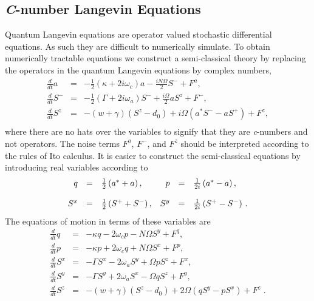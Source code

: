 \documentclass[aps,
twocolumn,
showpacs,
superscriptaddress,groupedaddress]{revtex4}
\begin{document}
\subsection{{\it C}-number Langevin Equations}

Quantum Langevin equations are operator valued stochastic differential
equations.  As such they are difficult to numerically simulate. To
obtain numerically tractable equations we construct a semi-classical
theory by replacing the operators in the quantum Langevin equations by
complex numbers,
\begin{eqnarray}
\frac{d}{dt} a&=& -\frac{1}{2}  (\kappa +2i\omega_c) a
-\frac{i N \Omega}{2} S^{-}
+F^{a},
\label{Lac}\\
\frac{d}{dt} S^{-} &=& -\frac{1}{2}  \left(\Gamma +2 i \omega_a \right)  S^{-}
+\frac{i \Omega}{2} a S^{z}
+F^{-},\\
\frac{d}{dt} S^{z} &=& -(w+\gamma)\left( S^{z} - d_0\right)
+i\Omega \left( a^{*}S^{-} - a S^{+} \right)
+F^{z},\nonumber\\
\label{Lszc}
\end{eqnarray}
where there are no hats over the variables to signify that they are
{\it c}-numbers and not operators.  The noise terms $F^a$, $F^-$, and
$F^z$ should be interpreted according to the rules of Ito calculus. It is easier to construct the semi-classical equations by introducing
real variables according to
\begin{equation}
\begin{array}[b]{rclrcl}
q &=&
\frac{1}{2} \left( a^{*} + a \right),&
p &=&
\frac{1}{2i} \left( a^{*} - a \right),
\\[1pc]
S^x &=&
\frac{1}{2} \left( S^{+} + S^{-} \right),&
S^y &=&
\frac{1}{2i} \left( S^{+} - S^{-} \right)\,.
\end{array}
\end{equation}
The equations of motion in terms of these variables are
\begin{eqnarray}
\frac{d}{dt} q &=& -\kappa q - 2 \omega_c p - N \Omega S^{y} + F^{q},
\label{cq1}
\\
\frac{d}{dt} p&=& -\kappa p + 2 \omega_c q + N \Omega S^{x} + F^{p},
\\
\frac{d}{dt} S^{x} &=&
-\Gamma S^{x}  - 2 \omega_a S^{y} + \Omega p S^{z} + F^{x},
\\
\frac{d}{dt} S^{y} &=&
-\Gamma S^{y}  + 2 \omega_a S^{x} - \Omega q S^{z} + F^{y},
\\
\frac{d}{dt} S^{z} &=& -(w+\gamma)\left( S^{z} - d_0\right)
+2 \Omega \left( q S^{y} - p S^{x} \right)
+F^{z}\;.
\nonumber
\\
\label{eqn:cnumberlangevin}
\end{eqnarray}
\end{document}
